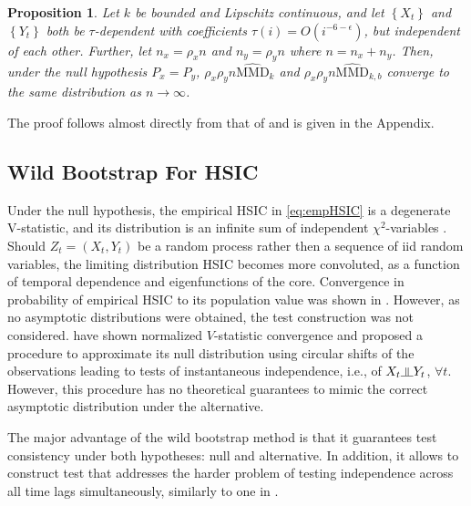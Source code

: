\documentclass{article} %
\newtheorem{proposition}{Proposition}
\newcommand{\indep}{\rotatebox[origin=c]{90}{$\models$}}
\begin{document}
\begin{proposition}\label{prop:mmd}
 Let $k$ be bounded and Lipschitz continuous, and let $\left\{ X_t \right\}$ and $\left\{ Y_t \right\}$ 
 both be $\tau$-dependent with coefficients $\tau(i) =  O(i^{-6-\epsilon})$, but independent of each other. Further, let $n_x=\rho_x n$ and $n_y=\rho_y n$ where $n=n_x+n_y$. Then, under the null hypothesis $P_x=P_y$, $\rho_x \rho_y n\widehat{\text{MMD}}_k$ and $\rho_x \rho_y n\widehat{\text{MMD}}_{k,b}$ converge to the same distribution as $n\to\infty$.
\end{proposition}
The proof follows almost directly from that of \cite[Theorem 3.1]{leucht_dependent_2013} and is given in the Appendix.


\subsection{Wild Bootstrap For HSIC}
Under the null hypothesis, the empirical HSIC in \eqref{eq:empHSIC} is a degenerate V-statistic, and its distribution is an infinite sum of independent $\chi^2$-variables \cite{gretton_kernel_2008}. Should $Z_t=(X_t,Y_t)$ be a random process rather then a sequence of iid random variables, the limiting distribution HSIC becomes more convoluted, as a function of temporal dependence and eigenfunctions of the core. Convergence in probability of empirical HSIC to its population value was shown in \cite{smola_kernel_2008}. However, as no asymptotic distributions were obtained, the test construction was not considered. \cite{chwialkowski2014kernel} have shown normalized $V$-statistic convergence and proposed a procedure to approximate its null distribution using circular shifts of the observations leading to tests of instantaneous independence, i.e., of $X_t \indep Y_t$, $\forall t$. However, this procedure has no theoretical guarantees to mimic the correct asymptotic distribution under the alternative. 

The major advantage of the wild bootstrap method is that it guarantees test consistency under both hypotheses: null and alternative. In addition, it allows to construct test that addresses the harder problem of testing independence across all time lags simultaneously, similarly to one in \cite{besserve_statistical_2013}.
\end{document}
